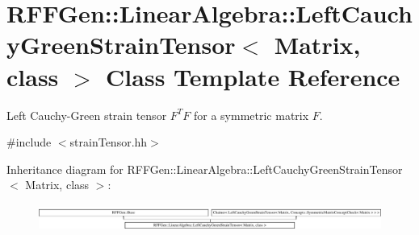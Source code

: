 \hypertarget{classRFFGen_1_1LinearAlgebra_1_1LeftCauchyGreenStrainTensor}{\section{R\-F\-F\-Gen\-:\-:Linear\-Algebra\-:\-:Left\-Cauchy\-Green\-Strain\-Tensor$<$ Matrix, class $>$ Class Template Reference}
\label{classRFFGen_1_1LinearAlgebra_1_1LeftCauchyGreenStrainTensor}
}


Left Cauchy-\/\-Green strain tensor $ F^T F $ for a symmetric matrix $ F $.  




{\ttfamily \#include $<$strain\-Tensor.\-hh$>$}

Inheritance diagram for R\-F\-F\-Gen\-:\-:Linear\-Algebra\-:\-:Left\-Cauchy\-Green\-Strain\-Tensor$<$ Matrix, class $>$\-:\begin{figure}[H]
\begin{center}
\leavevmode
\includegraphics[height=0.898876cm]{classRFFGen_1_1LinearAlgebra_1_1LeftCauchyGreenStrainTensor}
\end{center}
\end{figure}

